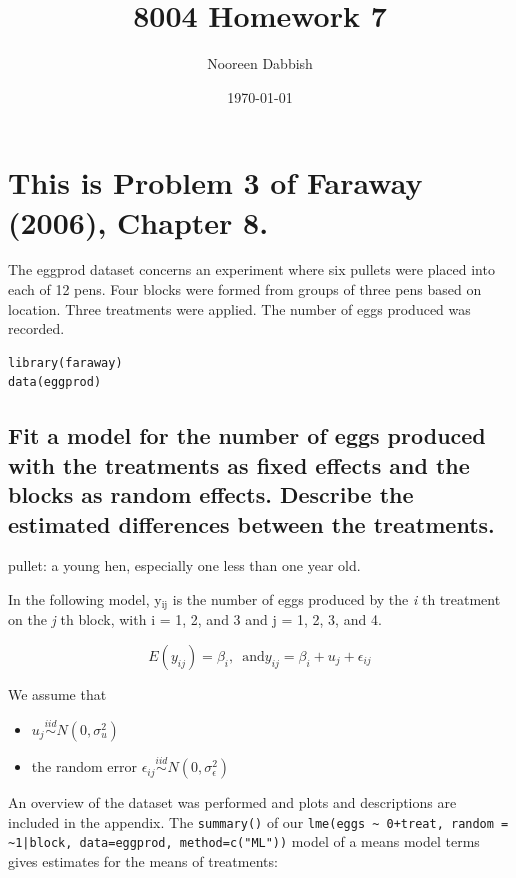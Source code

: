 \documentclass[11pt]{article}
\title{8004 Homework 7}
\author{Nooreen Dabbish}
\date{\today}
\begin{document}
\maketitle




\section{This is Problem 3 of Faraway (2006), Chapter 8.}
\label{sec-1}

The eggprod dataset concerns an experiment where six pullets were placed into each of 12 pens.
Four blocks were formed from groups of three pens based on location. Three treatments were
applied. The number of eggs produced was recorded.


\begin{verbatim}
library(faraway)
data(eggprod)
\end{verbatim}
\subsection{Fit a model for the number of eggs produced with the treatments as fixed effects and the blocks as random effects. Describe the estimated differences between the treatments.}
\label{sec-1-1}



pullet: a young hen, especially one less than one year old.

In the following model, y$_{\mathrm{ij}}$ is the number of eggs produced by the
\emph{i} th treatment on the \emph{j} th block, with i = 1, 2, and 3 and j = 1,
2, 3, and 4.

$$E(y_{ij}) = \beta_i,\,\text{ and
}y_{ij}=\beta_i+u_{j}+\epsilon_{ij}$$

We assume that 
\begin{itemize}
\item $u_{j}\overset{iid}\sim N(0,\sigma^2_u)$
\item the random error $\epsilon_{ij}\overset{iid}\sim
   N(0,\sigma^2_\epsilon)$
\end{itemize}


 



An overview of the dataset was performed and plots and descriptions are included in the
appendix. The \verb~summary()~ of our \verb.lme(eggs ~ 0+treat, random = ~1|block, data=eggprod, method=c("ML")). model of a means model terms gives
estimates for the means of treatments:
\end{document}
